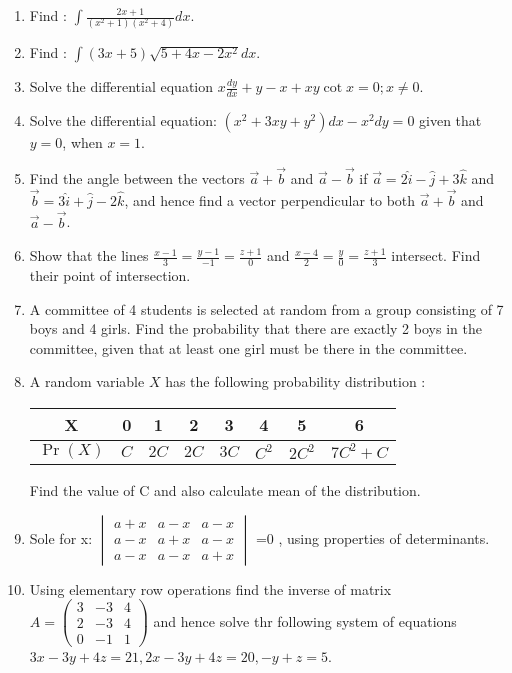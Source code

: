 \documentclass[journal,12pt,onecolumn]{IEEEtran}
\theoremstyle{remark}
\providecommand{\pr}[1]{\ensuremath{\Pr\left(#1\right)}}
\providecommand{\brak}[1]{\ensuremath{\left(#1\right)}}
\newcommand{\myvec}[1]{\ensuremath{\begin{pmatrix}#1\end{pmatrix}}}
\newcommand{\mydet}[1]{\ensuremath{\begin{vmatrix}#1\end{vmatrix}}}
\providecommand{\pr}[1]{\ensuremath{\Pr\left(#1\right)}}
\begin{document}
\begin{enumerate}
    \item Find : $\int \frac{2x+1}{\brak{x^2+1}\brak{x^2+4}}dx$.
    \item Find : $\int \brak{3x+5}\sqrt{5+4x-2x^2}dx$.
    \item Solve the differential equation $x\frac{dy}{dx} +y -x +xy \cot x= 0; x\neq 0$.
    \item Solve the differential equation: $\brak{x^2+3xy+y^2}dx -x^2dy = 0$ given that $y=0$, when $x=1$.
    \item Find the angle between the vectors $\vec{a} + \vec{b}$ and $\vec{a}-\vec{b}$ if $\vec{a}=2\hat{i}-\hat{j}+3\hat{k}$ and $\vec{b}= 3\hat{i} + \hat{j} -2\hat{k}$, and hence find a vector perpendicular to both $\vec{a}+\vec{b}$ and $\vec{a}-\vec{b}$.
    \item Show that the lines $\frac{x-1}{3}= \frac{y-1}{-1} = \frac{z+1}{0}$ and $\frac{x-4}{2}= \frac{y}{0} = \frac{z+1}{3}$ intersect. Find their point of intersection.
    \item A committee of 4 students is selected at random from a group consisting of 7 boys and 4 girls. Find the probability that there are exactly 2 boys in the committee, given that at least one girl must be there in the committee.
    \item A random variable $X$ has the following probability distribution :\\
          \begin{center}
              \begin{table}[h!]
                  \begin{tabular}{|c |c| c | c | c | c | c | c |}
                      \hline
                      X        & 0   & 1    & 2    & 3    & 4     & 5      & 6         \\
                      \hline
                      $\pr{X}$ & $C$ & $2C$ & $2C$ & $3C$ & $C^2$ & $2C^2$ & $7C^2 +C$ \\
                      \hline
                  \end{tabular}
              \end{table}
          \end{center}
          Find the value of C and also calculate mean of the distribution.
    \item Sole for x: \mydet{a+x & a-x &a-x\\a-x&a+x& a-x\\a-x & a-x & a+x} =0 , using properties of determinants.
    \item Using elementary row operations find the inverse of matrix $A =\myvec{3&-3&4\\2&-3&4\\0&-1&1}$ and hence solve thr following system of equations $3x-3y+4z=21,2x-3y+4z=20,-y+z=5$.

\end{enumerate}
\end{document}
